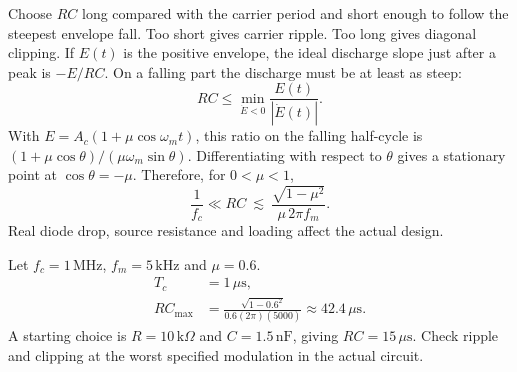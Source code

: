 \documentclass[12pt,a4paper]{article}
\begin{document}
\begin{tcolorbox}[tikzbox, unbreakable, title={Diode Envelope Detector Circuit}]
\centering
{}\par
\end{tcolorbox}

Choose $RC$ long compared with the carrier period and short enough to follow the steepest envelope fall. Too short gives carrier ripple. Too long gives diagonal clipping. If $E(t)$ is the positive envelope, the ideal discharge slope just after a peak is $-E/RC$. On a falling part the discharge must be at least as steep:
\[
 RC\le \min_{\dot E<0}\frac{E(t)}{|\dot E(t)|}.
\]
With $E=A_c(1+\mu\cos\omega_mt)$, this ratio on the falling half-cycle is $(1+\mu\cos\theta)/(\mu\omega_m\sin\theta)$. Differentiating with respect to $\theta$ gives a stationary point at $\cos\theta=-\mu$. Therefore, for $0<\mu<1$,
\[
 \frac{1}{f_c}\ll RC
 \ \lesssim\ \frac{\sqrt{1-\mu^2}}{\mu\,2\pi f_m}.
\]
Real diode drop, source resistance and loading affect the actual design.

\begin{tcolorbox}[examplebox, title={Select a Detector Time Constant}]
Let $f_c=1\,\mathrm{MHz}$, $f_m=5\,\mathrm{kHz}$ and $\mu=0.6$.
\[
\begin{aligned}
 T_c &=1\,\mu\mathrm{s},\\
 RC_{\max}&=\frac{\sqrt{1-0.6^2}}{0.6(2\pi)(5000)}
            \approx42.4\,\mu\mathrm{s}.
\end{aligned}
\]
A starting choice is $R=10\,\mathrm{k}\Omega$ and $C=1.5\,\mathrm{nF}$, giving $RC=15\,\mu\mathrm{s}$. Check ripple and clipping at the worst specified modulation in the actual circuit.
\end{tcolorbox}
\end{document}
